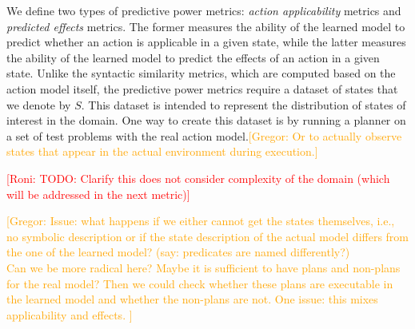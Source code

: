 \documentclass{article}
\theoremstyle{definition}
\theoremstyle{remark}
\newcommand{\roni}[1]{{\textcolor{red}{[Roni: #1]}}}
\newcommand{\gregor}[1]{{\textcolor{orange}{[Gregor: #1]}}}
\begin{document}
We define two types of predictive power metrics: \emph{action applicability} metrics and \emph{predicted effects} metrics. 
The former measures the ability of the learned model to predict whether an action is applicable in a given state, while the latter measures the ability of the learned model to predict the effects of an action in a given state.
Unlike the syntactic similarity metrics, which are computed based on the action model itself, the predictive power metrics require a dataset of states that we denote by $S$. 
This dataset is intended to represent the distribution of states of interest in the domain. 
One way to create this dataset is by running a planner on a set of test problems with the real action model.\gregor{Or to actually observe states that appear in the actual environment during execution.}

\roni{TODO: Clarify this does not consider complexity of the domain (which will be addressed in the next metric)}

\gregor{Issue: what happens if we either cannot get the states themselves, i.e., no symbolic description or if the state description of the actual model differs from the one of the learned model? (say: predicates are named differently?)\\
Can we be more radical here? Maybe it is sufficient to have plans and non-plans for the real model? Then we could check whether these plans are executable in the learned model and whether the non-plans are not. One issue: this mixes applicability and effects.
}
\end{document}
